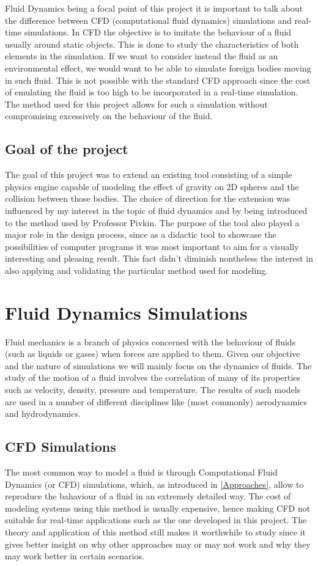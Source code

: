 \documentclass[]{usiinfbachelorproject}
\begin{document}
Fluid Dynamics being a focal point of this project it is important to talk about 
the difference between CFD (computational fluid dynamics) simulations and real-time 
simulations. In CFD the objective is to imitate the behaviour of a fluid usually around static 
objects. This is done to study the characteristics of both elements in the simulation.
If we want to consider instead the fluid as an environmental effect, we would want to be 
able to simulate foreign bodies moving in such fluid. This is not possible with the standard CFD 
approach since the cost of emulating the fluid is too high to be incorporated in a real-time simulation.
The method used for this project allows for such a simulation without compromising excessively on the 
behaviour of the fluid.

\newpage
\subsection{Goal of the project}
The goal of this project was to extend an existing tool consisting of a simple physics engine 
capable of modeling the effect of gravity on 2D spheres and the collision between those bodies.
The choice of direction for the extension was influenced by my interest in the topic 
of fluid dynamics and by being introduced to the method used by Professor Pivkin. 
The purpose of the tool also played a major role in the design process, since 
as a didactic tool to showcase the possibilities of computer programs it was most important 
to aim for a visually interesting and pleasing result. This fact didn't diminish nontheless the 
interest in also applying and validating the particular method used for modeling.

\newpage
\section{Fluid Dynamics Simulations}
Fluid mechanics is a branch of physics concerned with the behaviour of fluids (such as liquids or gases) 
when forces are applied to them. Given our objective and the nature of simulations we will mainly 
focus on the dynamics of fluids. The study of the motion of a fluid involves the correlation of many of its 
properties such as velocity, density, pressure and temperature. The results of such models are used 
in a number of different disciplines like (most commonly) aerodynamics and hydrodynamics.

\subsection{CFD Simulations}
The most common way to model a fluid is through Computational Fluid Dynamics (or CFD) simulations, which, as introduced in 
\ref{Approaches}, allow to reproduce the bahaviour of a fluid in an extremely detailed way. The cost of modeling systems using this 
method is usually expensive, hence making CFD not suitable for real-time applications such as the one developed in this project.
The theory and application of this method still makes it worthwhile to study since it gives better insight 
on why other approaches may or may not work and why they may work better in certain scenarios.
\end{document}

